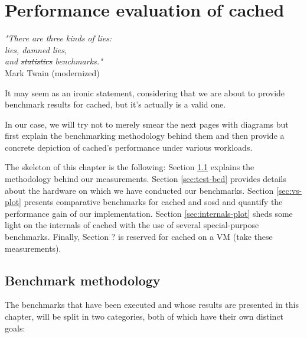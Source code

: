 \chapter{Performance evaluation of cached}\label{ch:cached-evaluation}

\begin{flushright}
	\textit{"There are three kinds of lies:\\
		lies, damned lies, \\
		and \sout{statistics} benchmarks."}	\\

	Mark Twain (modernized)
\end{flushright}

It may seem as an ironic statement, considering that we are about to provide 
benchmark results for cached, but it's actually is a valid one.
\begin{comment}
What Mr.  Twain tries to say here
\footnote{
	and that's a phrase usually not heard in programming contexts...
}
is that the presentation of partials facts for something can be used to 
fabricate a plausible truth for it.
In science's case, it so often happens that promising results for an experiment 
can seem more important to the researcher's eye than negative ones due to 
positive reinforcement.
\end{comment}
In our case, we will try not to merely smear the next pages with diagrams but 
first explain the benchmarking methodology behind them and then provide a 
concrete depiction of cached's performance under various workloads.

The skeleton of this chapter is the following: Section \ref{sec:perf-meth} 
explains the methodology behind our measurements. Section \ref{sec:test-bed} 
provides details about the hardware on which we have conducted our benchmarks.  
Section \ref{sec:vs-plot} presents comparative benchmarks for cached and sosd 
and quantify the performance gain of our implementation. Section 
\ref{sec:internals-plot} sheds some light on the internals of cached with the 
use of several special-purpose benchmarks. Finally, Section ?  is reserved for 
cached on a VM (\fixme take these measurements).

\section{Benchmark methodology}\label{sec:perf-meth}

The benchmarks that have been executed and whose results are presented in this 
chapter, will be split in two categories, both of which have their own distinct 
goals:

